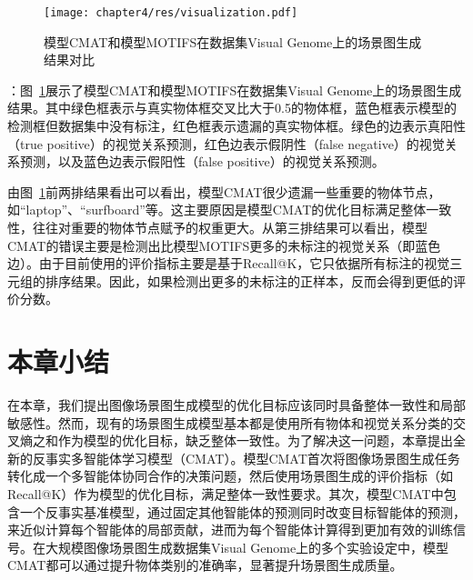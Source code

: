 \begin{figure}[t]
    \centering
    \texttt{[image: chapter4/res/visualization.pdf]}
    \caption{模型CMAT和模型MOTIFS在数据集Visual Genome上的场景图生成结果对比}
    \label{ch4:fig:visualization}
\end{figure}

\textbf{}：图~\ref{ch4:fig:visualization}展示了模型CMAT和模型MOTIFS在数据集Visual Genome上的场景图生成结果。其中绿色框表示与真实物体框交叉比大于0.5的物体框，蓝色框表示模型的检测框但数据集中没有标注，红色框表示遗漏的真实物体框。绿色的边表示真阳性（true positive）的视觉关系预测，红色边表示假阴性（false negative）的视觉关系预测，以及蓝色边表示假阳性（false positive）的视觉关系预测。

由图~\ref{ch4:fig:visualization}前两排结果看出可以看出，模型CMAT很少遗漏一些重要的物体节点，如“laptop”、“surfboard”等。这主要原因是模型CMAT的优化目标满足整体一致性，往往对重要的物体节点赋予的权重更大。从第三排结果可以看出，模型CMAT的错误主要是检测出比模型MOTIFS更多的未标注的视觉关系（即蓝色边）。由于目前使用的评价指标主要是基于Recall@K，它只依据所有标注的视觉三元组的排序结果。因此，如果检测出更多的未标注的正样本，反而会得到更低的评价分数。


\section{本章小结}

在本章，我们提出图像场景图生成模型的优化目标应该同时具备整体一致性和局部敏感性。然而，现有的场景图生成模型基本都是使用所有物体和视觉关系分类的交叉熵之和作为模型的优化目标，缺乏整体一致性。为了解决这一问题，本章提出全新的反事实多智能体学习模型（CMAT）。模型CMAT首次将图像场景图生成任务转化成一个多智能体协同合作的决策问题，然后使用场景图生成的评价指标（如Recall@K）作为模型的优化目标，满足整体一致性要求。其次，模型CMAT中包含一个反事实基准模型，通过固定其他智能体的预测同时改变目标智能体的预测，来近似计算每个智能体的局部贡献，进而为每个智能体计算得到更加有效的训练信号。在大规模图像场景图生成数据集Visual Genome上的多个实验设定中，模型CMAT都可以通过提升物体类别的准确率，显著提升场景图生成质量。
